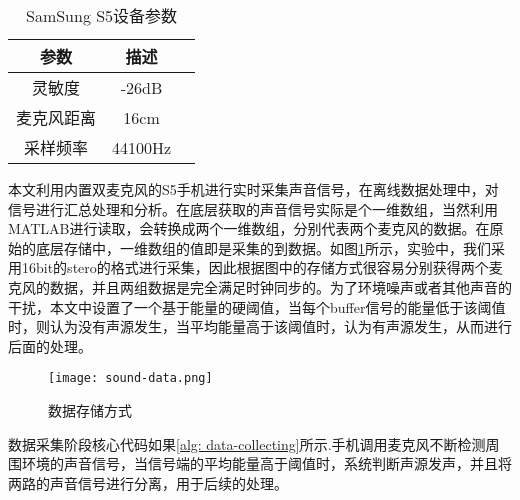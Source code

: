 \documentclass[winfonts]{njuthesis}
\begin{document}
		\begin{table}[htbp]
			\setlength{\belowcaptionskip}{7pt}
			\caption{SamSung S5设备参数}
			\centering
			\begin{tabular}{ccc}
				\hline 
				参数 & 描述 \\
				\hline
				灵敏度 & -26dB\\
				麦克风距离 & 16cm \\
				采样频率 & 44100Hz\\
				\hline
			\end{tabular} 
			\vspace{0.2cm}
			\label{table: parameters-of-S5}
		\end{table}
	
		本文利用内置双麦克风的S5手机进行实时采集声音信号，在离线数据处理中，对信号进行汇总处理和分析。在底层获取的声音信号实际是个一维数组，当然利用MATLAB进行读取，会转换成两个一维数组，分别代表两个麦克风的数据。在原始的底层存储中，一维数组的值即是采集的到数据。如图\ref{fig: sound-data}所示，实验中，我们采用16bit的stero的格式进行采集，因此根据图中的存储方式很容易分别获得两个麦克风的数据，并且两组数据是完全满足时钟同步的。为了环境噪声或者其他声音的干扰，本文中设置了一个基于能量的硬阈值，当每个buffer信号的能量低于该阈值时，则认为没有声源发生，当平均能量高于该阈值时，认为有声源发生，从而进行后面的处理。
		
		\begin{figure}[H]
			\centering
			\texttt{[image: sound-data.png]} 
			\caption{数据存储方式}
			\label{fig: sound-data}
		\end{figure}
		
		数据采集阶段核心代码如果\ref{alg: data-collecting}所示.手机调用麦克风不断检测周围环境的声音信号，当信号端的平均能量高于阈值时，系统判断声源发声，并且将两路的声音信号进行分离，用于后续的处理。
		
\end{document}
